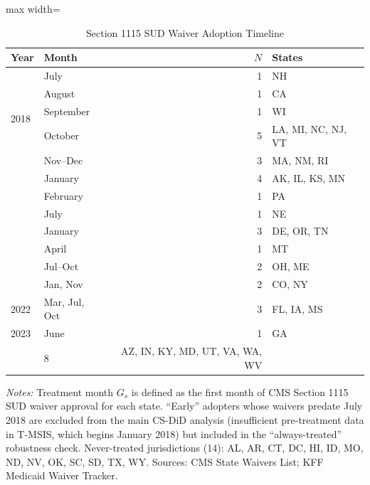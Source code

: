 \begin{table}[htbp]
\centering
\caption{Section 1115 SUD Waiver Adoption Timeline}
\label{tab:waiver_timeline}
\begin{threeparttable}
\begin{adjustbox}{max width=\textwidth}
\begin{tabular}{llrl}
\toprule
Year & Month & $N$ & States \\
\midrule
\multirow{5}{*}{2018} & July & 1 & NH \\
 & August & 1 & CA \\
 & September & 1 & WI \\
 & October & 5 & LA, MI, NC, NJ, VT \\
 & Nov--Dec & 3 & MA, NM, RI \\
\addlinespace
\multirow{3}{*}{2019} & January & 4 & AK, IL, KS, MN \\
 & February & 1 & PA \\
 & July & 1 & NE \\
\addlinespace
\multirow{3}{*}{2020} & January & 3 & DE, OR, TN \\
 & April & 1 & MT \\
 & Jul--Oct & 2 & OH, ME \\
\addlinespace
2021 & Jan, Nov & 2 & CO, NY \\
2022 & Mar, Jul, Oct & 3 & FL, IA, MS \\
2023 & June & 1 & GA \\
\addlinespace
\multicolumn{2}{l}{Early (pre-July 2018)} & 8 & AZ, IN, KY, MD, UT, VA, WA, WV \\
\bottomrule
\end{tabular}
\end{adjustbox}
\begin{tablenotes}[flushleft]
\small
\item \textit{Notes:} Treatment month $G_s$ is defined as the first month of CMS Section 1115 SUD waiver approval for each state. ``Early'' adopters whose waivers predate July 2018 are excluded from the main CS-DiD analysis (insufficient pre-treatment data in T-MSIS, which begins January 2018) but included in the ``always-treated'' robustness check. Never-treated jurisdictions (14): AL, AR, CT, DC, HI, ID, MO, ND, NV, OK, SC, SD, TX, WY. Sources: CMS State Waivers List; KFF Medicaid Waiver Tracker.
\end{tablenotes}
\end{threeparttable}
\end{table}
